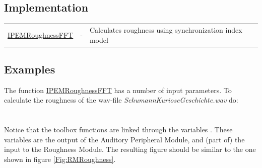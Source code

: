

\subsection{Implementation}

\begin{tabularx}{\linewidth}{llX}
\hyperlink{FuncRef:IPEMRoughnessFFT}{IPEMRoughnessFFT} & - & Calculates roughness using synchronization index model\\
\end{tabularx}


\subsection{Examples}

The function
\hyperlink{FuncRef:IPEMRoughnessFFT}{IPEMRoughnessFFT}
has a number of input parameters. To calculate the roughness of
the wav-file \emph{SchumannKurioseGeschichte.wav} do:\\

\\

\\

Notice that the toolbox functions are linked through the variables
. These variables are
the output of the Auditory Peripheral Module, and (part of) the
input to the Roughness Module. The resulting figure should be
similar to the one shown in figure \ref{Fig:RMRoughness}.\\

